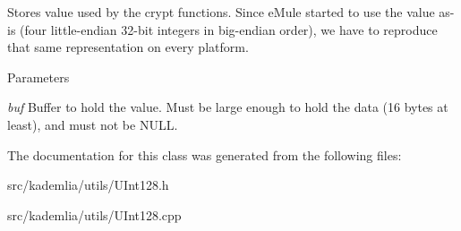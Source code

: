 Stores value used by the crypt functions. Since eMule started to use the value as-\/is (four little-\/endian 32-\/bit integers in big-\/endian order), we have to reproduce that same representation on every platform.


\begin{DoxyParams}{Parameters}
\item[{\em buf}]Buffer to hold the value. Must be large enough to hold the data (16 bytes at least), and must not be NULL. \end{DoxyParams}


The documentation for this class was generated from the following files:\begin{DoxyCompactItemize}
\item 
src/kademlia/utils/UInt128.h\item 
src/kademlia/utils/UInt128.cpp\end{DoxyCompactItemize}
